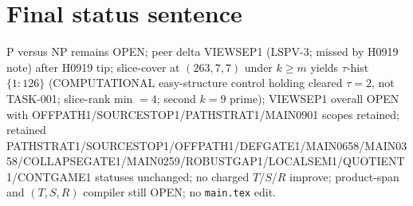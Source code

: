 \documentclass[11pt]{article}
\begin{document}
\section*{Final status sentence}
P versus NP remains OPEN; peer delta VIEWSEP1 (LSPV-3; missed by H0919 note) after H0919 tip; slice-cover at $(263,7,7)$ under $k{\ge}m$ yields $\tau$-hist $\{1{:}126\}$ (COMPUTATIONAL easy-structure control holding cleared $\tau{=}2$, not TASK-001; slice-rank min $=4$; second $k{=}9$ prime); VIEWSEP1 overall OPEN with OFFPATH1/SOURCESTOP1/PATHSTRAT1/MAIN0901 scopes retained; retained PATHSTRAT1/SOURCESTOP1/OFFPATH1/DEFGATE1/MAIN0658/MAIN0358/COLLAPSEGATE1/MAIN0259/ROBUSTGAP1/LOCALSEM1/QUOTIENT1/CONTGAME1 statuses unchanged; no charged $T$/$S$/$R$ improve; product-span and $(T,S,R)$ compiler still OPEN; no \texttt{main.tex} edit.
\end{document}
